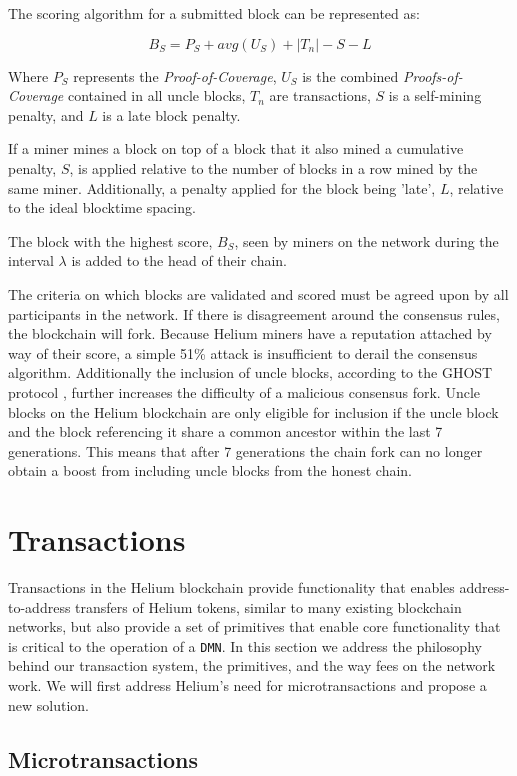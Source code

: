 \documentclass[10pt, nonatbib, nocopyrightspace, reprint]{sigplanconf}
\begin{document}
The scoring algorithm for a submitted block can be represented as:

\[B_S = P_S + avg(U_S) + |T_n|  - S - L \]

Where $P_S$ represents the \emph{Proof-of-Coverage}, $U_S$ is the combined \emph{Proofs-of-Coverage} contained in all uncle blocks, $T_n$ are transactions, $S$ is a self-mining penalty, and $L$ is a late block penalty.

If a miner mines a block on top of a block that it also mined  a cumulative penalty, $S$, is applied relative to the number of blocks in a row mined by the same miner. Additionally, a penalty applied for the block being 'late', $L$, relative to the ideal blocktime spacing.

The block with the highest score, $B_S$, seen by miners on the network during the interval $\lambda$ is added to the head of their chain.

The criteria on which blocks are validated and scored must be agreed upon by all participants in the network. If there is disagreement around the consensus rules, the blockchain will fork. Because Helium miners have a reputation attached by way of their score, a simple 51\% attack is insufficient to derail the consensus algorithm. Additionally the inclusion of uncle blocks, according to the GHOST protocol \cite{ghost}, further increases the difficulty of a malicious consensus fork. Uncle blocks on the Helium blockchain are only eligible for inclusion if the uncle block and the block referencing it share a common ancestor within the last 7 generations. This means that after 7 generations the chain fork can no longer obtain a boost from including uncle blocks from the honest chain.

\section{Transactions}\label{transactions}

Transactions in the Helium blockchain provide functionality that enables address-to-address transfers of Helium tokens, similar to many existing blockchain networks, but also provide a set of primitives that enable core functionality that is critical to the operation of a \verb|DMN|. In this section we address the philosophy behind our transaction system, the primitives, and the way fees on the network work. We will first address Helium's need for microtransactions and propose a new solution.

\subsection{Microtransactions} \label{microtransactions}
\end{document}
